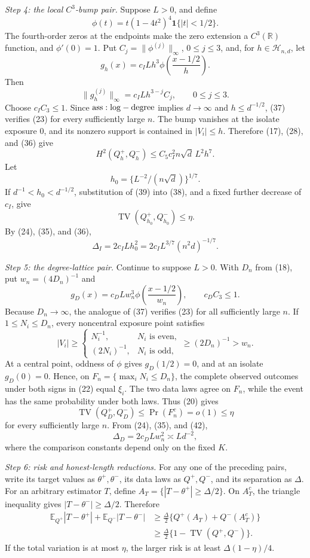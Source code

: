 \textit{Step 4: the local \(C^3\)-bump pair.}
Suppose \(L>0\), and define
\[
 \phi(t)=t(1-4t^2)^4\mathbf1\{|t|<1/2\}.
\tag{35}
\]
The fourth-order zeros at the endpoints make the zero extension a \(C^3(\mathbb R)\) function, and \(\phi'(0)=1\).  Put \(C_j=\|\phi^{(j)}\|_\infty\), \(0\leq j\leq3\), and, for \(h\in\mathcal H_{n,d}\), let
\[
 g_h(x)=c_ILh^3\phi\!\left(\frac{x-1/2}{h}\right).
\tag{36}
\]
Then
\[
 \|g_h^{(j)}\|_\infty=c_ILh^{3-j}C_j,
 \qquad 0\leq j\leq3.
\tag{37}
\]
Choose \(c_IC_3\leq1\).  Since \({\rm ass:log-degree}\) implies \(d\to\infty\) and \(h\leq d^{-1/2}\), (37) verifies (23) for every sufficiently large \(n\).  The bump vanishes at the isolate exposure \(0\), and its nonzero support is contained in \(|V_i|\leq h\).  Therefore (17), (28), and (36) give
\[
 H^2(Q_h^+,Q_h^-)
 \leq C_5c_I^2n\sqrt d\,L^2h^7.
\tag{38}
\]
Let
\[
 h_0=\{L^{-2}/(n\sqrt d)\}^{1/7}.
\tag{39}
\]
If \(d^{-1}<h_0<d^{-1/2}\), substitution of (39) into (38), and a fixed further decrease of \(c_I\), give
\[
 \operatorname{TV}(Q_{h_0}^+,Q_{h_0}^-)\leq\eta.
\tag{40}
\]
By (24), (35), and (36),
\[
 \Delta_I=2c_ILh_0^2
 =2c_IL^{3/7}(n^2d)^{-1/7}.
\tag{41}
\]

\textit{Step 5: the degree-lattice pair.}
Continue to suppose \(L>0\).  With \(D_n\) from (18), put \(w_n=(4D_n)^{-1}\) and
\[
 g_D(x)=c_DLw_n^3\phi\!\left(\frac{x-1/2}{w_n}\right),
 \qquad c_DC_3\leq1.
\tag{42}
\]
Because \(D_n\to\infty\), the analogue of (37) verifies (23) for all sufficiently large \(n\).  If \(1\leq N_i\leq D_n\), every noncentral exposure point satisfies
\[
 |V_i|\geq
 \begin{cases}N_i^{-1},&N_i\text{ is even},\\(2N_i)^{-1},&N_i\text{ is odd},\end{cases}
 \geq(2D_n)^{-1}>w_n.
\tag{43}
\]
At a central point, oddness of \(\phi\) gives \(g_D(1/2)=0\), and at an isolate \(g_D(0)=0\).  Hence, on \(F_n=\{\max_iN_i\leq D_n\}\), the complete observed outcomes under both signs in (22) equal \(\xi_i\).  The two data laws agree on \(F_n\), while the event has the same probability under both laws.  Thus (20) gives
\[
 \operatorname{TV}(Q_D^+,Q_D^-)
 \leq\Pr(F_n^c)=o(1)\leq\eta
\tag{44}
\]
for every sufficiently large \(n\).  From (24), (35), and (42),
\[
 \Delta_D=2c_DLw_n^2\asymp Ld^{-2},
\tag{45}
\]
where the comparison constants depend only on the fixed \(K\).

\textit{Step 6: risk and honest-length reductions.}
For any one of the preceding pairs, write its target values as \(\theta^+,\theta^-\), its data laws as \(Q^+,Q^-\), and its separation as \(\Delta\).  For an arbitrary estimator \(T\), define \(A_T=\{|T-\theta^+|\geq\Delta/2\}\).  On \(A_T^c\), the triangle inequality gives \(|T-\theta^-|\geq\Delta/2\).  Therefore
\[
 \begin{aligned}
 \mathbb E_{Q^+}|T-\theta^+|+\mathbb E_{Q^-}|T-\theta^-|
 &\geq\frac\Delta2\{Q^+(A_T)+Q^-(A_T^c)\}\\
 &\geq\frac\Delta2\{1-\operatorname{TV}(Q^+,Q^-)\}.
 \end{aligned}
\tag{46}
\]
If the total variation is at most \(\eta\), the larger risk is at least \(\Delta(1-\eta)/4\).


